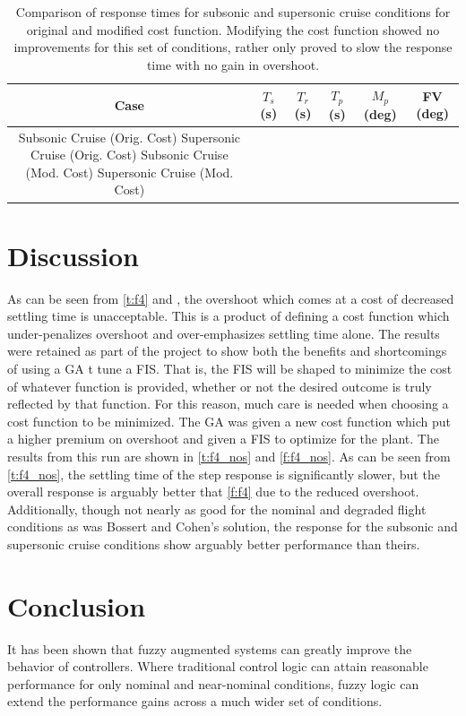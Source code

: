 \documentclass[12pt]{article}
\newcommand{\testdir}{test}
\begin{document}
\begin{table}[h]
	\centering
	\caption{Comparison of response times for subsonic and supersonic cruise conditions for original and modified cost function. Modifying the cost function showed no improvements for this set of conditions, rather only proved to slow the response time with no gain in overshoot.}\label{t:subsup}
	\begin{tabular}{|c|c|c|c|c|c|}\hline
	Case & $T_s$ (s) & $T_r$ (s) & $T_p$ (s) & $M_p$ (deg) & FV (deg) \\\hline
	Subsonic Cruise (Orig. Cost) 
	Supersonic Cruise (Orig. Cost) 
	Subsonic Cruise (Mod. Cost) 
	Supersonic Cruise (Mod. Cost) 
	\end{tabular}
\end{table}

\section{Discussion}
As can be seen from \cref{t:f4} and , the overshoot which comes at a cost of decreased settling time is unacceptable. This is a product of defining a cost function which under-penalizes overshoot and over-emphasizes settling time alone. The results were retained as part of the project to show both the benefits and shortcomings of using a GA t tune a FIS. That is, the FIS will be shaped to minimize the cost of whatever function is provided, whether or not the desired outcome is truly reflected by that function. For this reason, much care is needed when choosing a cost function to be minimized. The GA was given a new cost function which put a higher premium on overshoot and given a FIS to optimize for the plant. The results from this run are shown in \cref{t:f4_nos} and \cref{f:f4_nos}. As can be seen from \cref{t:f4_nos}, the settling time of the step response is significantly slower, but the overall response is arguably better that \cref{f:f4} due to the reduced overshoot. Additionally, though not nearly as good for the nominal and degraded flight conditions as was Bossert and Cohen's solution, the response for the subsonic and supersonic cruise conditions show arguably better performance than theirs.

\section{Conclusion}
It has been shown that fuzzy augmented systems can greatly improve the behavior of controllers. Where traditional control logic can attain reasonable performance for only nominal and near-nominal conditions, fuzzy logic can extend the performance gains across a much wider set of conditions.
\end{document}
